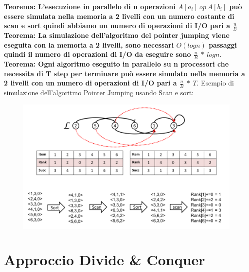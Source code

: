 \documentclass[14pt]{extreport}
\begin{document}
\textbf{Teorema: L'esecuzione in parallelo di n operazioni $A[a_i]\ op\ A[b_i]$ può essere simulata nella memoria a 2 livelli con un numero costante di scan e sort quindi abbiamo un numero di operazioni di I/O pari a $\frac{n}{B}$}
\newline \newline 
\textbf{Teorema: La simulazione dell'algoritmo del pointer jumping viene eseguita con la memoria a 2 livelli, sono necessari $O(log n)$ passaggi quindi il numero di operazioni di I/O da eseguire sono $\frac{n}{B}\ *\ logn $}.
\newline \newline 
\textbf{Teorema: Ogni algoritmo eseguito in parallelo su n processori che necessita di T step per terminare può essere simulato nella memoria a 2 livelli con un numero di operazioni di I/O pari a $\frac{n}{B}\ *\ T $}.
\newpage
Esempio di simulazione dell'algoritmo Pointer Jumping usando Scan e sort:

\begin{figure}[h!]
  \centering
  \includegraphics[width=\linewidth]{SimulazionePJ.png}
\end{figure}

\section{Approccio Divide & Conquer}
\end{document}

